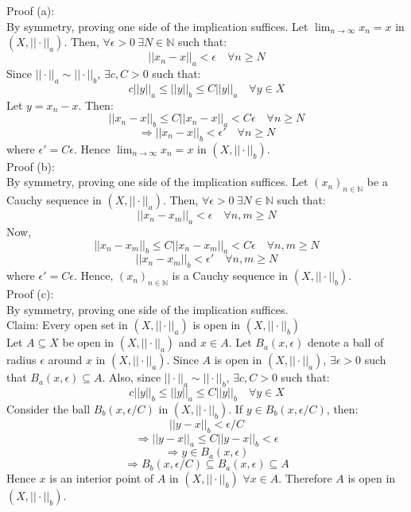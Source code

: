 \documentclass{article}
\begin{document}
	Proof (a): \\
	By symmetry, proving one side of the implication suffices.
	Let $\lim_{n \to \infty} x_n = x$ in $(X, ||\cdot||_a)$.
	Then, $\forall \epsilon > 0 ~ \exists N \in \mathbb{N}$ such that:
	\[ ||x_n - x||_a < \epsilon \quad \forall n \ge N \]
	Since $||\cdot||_a \sim ||\cdot||_b$, $\exists c, C > 0$ such that:
	\[ c ||y||_a \le ||y||_b \le C ||y||_a \quad \forall y \in X \]
	Let $y = x_n - x$.
	Then:
	\[ ||x_n - x||_b \le C ||x_n - x||_a < C \epsilon \quad \forall n \ge N \]
	\[ \Rightarrow ||x_n - x||_b < \epsilon' \quad \forall n \ge N \]
	where $\epsilon' = C \epsilon$.
	Hence $\lim_{n \to \infty} x_n = x$ in $(X, ||\cdot||_b)$. \\

	Proof (b): \\
	By symmetry, proving one side of the implication suffices.
	Let $(x_n)_{n \in \mathbb{N}}$ be a Cauchy sequence in $(X, ||\cdot||_a)$.
	Then, $\forall \epsilon > 0 ~ \exists N \in \mathbb{N}$ such that:
	\[ ||x_n - x_m||_a < \epsilon \quad \forall n, m \ge N \]
	Now,
	\[ ||x_n - x_m||_b \le C ||x_n - x_m||_a < C \epsilon \quad \forall n, m \ge N \]
	\[ ||x_n - x_m||_b < \epsilon' \quad \forall n, m \ge N \]
	where $\epsilon' = C \epsilon$.
	Hence, $(x_n)_{n \in \mathbb{N}}$ is a Cauchy sequence in $(X, ||\cdot||_b)$. \\

	Proof (c): \\
	By symmetry, proving one side of the implication suffices. \\
	Claim: Every open set in $(X, ||\cdot||_a)$ is open in $(X, ||\cdot||_b)$ \\
	Let $A \subseteq X$ be open in $(X, ||\cdot||_a)$ and $x \in A$.
	Let $B_a(x, \epsilon)$ denote a ball of radius $\epsilon$ around $x$ in $(X, ||\cdot||_a)$.
	Since $A$ is open in $(X, ||\cdot||_a)$, $\exists \epsilon > 0$ such that
	$B_a(x, \epsilon) \subseteq A$.
	Also, since $||\cdot||_a \sim ||\cdot||_b$, $\exists c, C > 0$ such that:
	\[ c ||y||_b \le ||y||_a \le C ||y||_b \quad \forall y \in X \]
	Consider the ball $B_b(x, \epsilon / C)$ in $(X, ||\cdot||_b)$.
	If $y \in B_b(x, \epsilon / C)$, then:
	\[ ||y - x||_b < \epsilon / C \]
	\[ \Rightarrow ||y - x||_a \le C ||y - x||_b < \epsilon \]
	\[ \Rightarrow y \in B_a(x, \epsilon) \]
	\[ \Rightarrow B_b(x, \epsilon / C) \subseteq B_a(x, \epsilon) \subseteq A \]
	Hence $x$ is an interior point of $A$ in $(X, ||\cdot||_b)$ $\forall x \in A$.
	Therefore $A$ is open in $(X, ||\cdot||_b)$.
\end{document}
